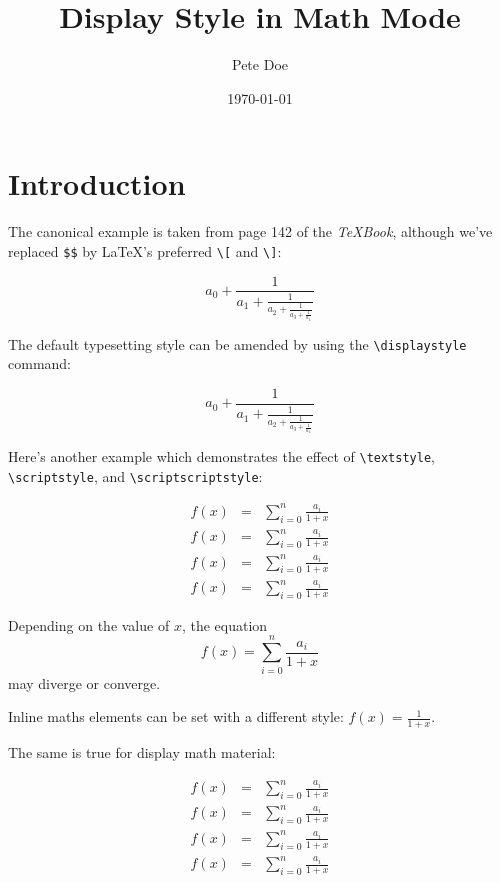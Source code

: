 \documentclass{article}
\title{Display Style in Math Mode}
\author{Pete Doe}
\date{\today}
\begin{document}
	\maketitle
	
	\section*{Introduction}
	The canonical example is taken from page 142 of the \textit{TeXBook}, although we've replaced \texttt{\$\$} by \LaTeX's preferred \texttt{\textbackslash[} and \texttt{\textbackslash]}:
	
	\[
	a_0 + \frac{1}{a_1 + \frac{1}{a_2 + \frac{1}{a_3 + \frac{1}{a_4}}}}
	\]
	
	The default typesetting style can be amended by using the \texttt{\textbackslash displaystyle} command:
	
	\[
	a_0 + \frac{1}{\displaystyle a_1 + \frac{1}{\displaystyle a_2 + \frac{1}{\displaystyle a_3 + \frac{1}{\displaystyle a_4}}}}
	\]
	
	Here's another example which demonstrates the effect of \texttt{\textbackslash textstyle}, \texttt{\textbackslash scriptstyle}, and \texttt{\textbackslash scriptscriptstyle}:
	
	\[
	\begin{array}{rcl}
		f(x) &=& \displaystyle \sum_{i=0}^{n} \frac{a_i}{1+x} \\[6pt]
		\textstyle f(x) &=& \textstyle \sum_{i=0}^{n} \frac{a_i}{1+x} \\[6pt]
		\scriptstyle f(x) &=& \scriptstyle \sum_{i=0}^{n} \frac{a_i}{1+x} \\[6pt]
		\scriptscriptstyle f(x) &=& \scriptscriptstyle \sum_{i=0}^{n} \frac{a_i}{1+x}
	\end{array}
	\]
	
	Depending on the value of \(x\), the equation 
	\[
	f(x) = \sum_{i=0}^{n} \frac{a_i}{1+x}
	\]
	may diverge or converge.
	
	\vspace{1cm}
	
	Inline maths elements can be set with a different style: 
	\(f(x) = \displaystyle \frac{1}{1+x}\).
	
	The same is true for display math material:
	
	\[
	\begin{array}{rcl}
		f(x) &=& \displaystyle \sum_{i=0}^{n} \frac{a_i}{1+x} \\[6pt]
		f(x) &=& \textstyle \sum_{i=0}^{n} \frac{a_i}{1+x} \\[6pt]
		f(x) &=& \scriptstyle \sum_{i=0}^{n} \frac{a_i}{1+x} \\[6pt]
		f(x) &=& \scriptscriptstyle \sum_{i=0}^{n} \frac{a_i}{1+x}
	\end{array}
	\]
	
\end{document}
